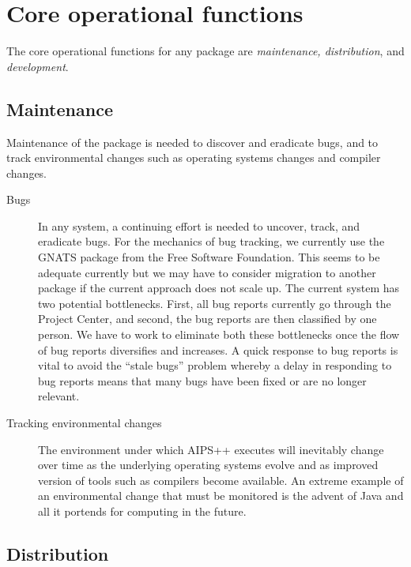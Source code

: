\section{Core operational functions}

The core operational functions for any package are {\em maintenance,
distribution}, and {\em development}.

\subsection{Maintenance}

Maintenance of the package is needed to discover and eradicate bugs, and
to track environmental changes such as operating systems changes
and compiler changes.
\begin{description}
\item[Bugs] In any system, a continuing effort is needed to uncover,
track, and eradicate bugs. For the mechanics of bug tracking, we
currently use the GNATS package from the Free Software
Foundation. This seems to be adequate currently but we may have to
consider migration to another package if the current approach does not
scale up.  The current system has two potential bottlenecks. First,
all bug reports currently go through the Project Center, and second,
the bug reports are then classified by one person. We have to work to
eliminate both these bottlenecks once the flow of bug reports
diversifies and increases. A quick response to bug reports is vital to
avoid the ``stale bugs'' problem whereby a delay in responding to bug
reports means that many bugs have been fixed or are no longer
relevant.
\item[Tracking environmental changes] The environment under which AIPS++
executes will inevitably change over time as the underlying operating
systems evolve and as improved version of tools such as compilers
become available. An extreme example of an environmental change
that must be monitored is the advent of Java and all it portends
for computing in the future.
\end{description}

\subsection{Distribution}

